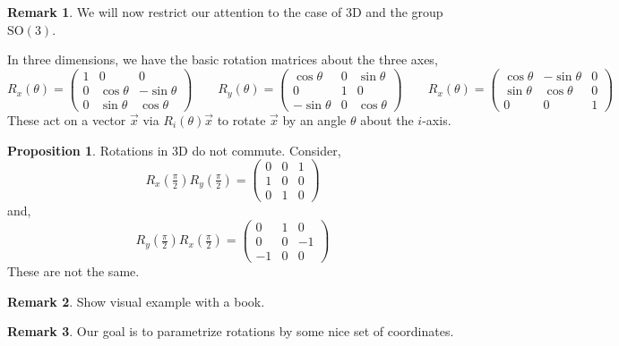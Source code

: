 \documentclass[12pt]{extarticle}
\theoremstyle{definition}
\newtheorem{proposition}[theorem]{Proposition}
\newtheorem{remark}{Remark}
\newenvironment{definition}[1][Definition:]{\begin{trivlist}
\item[\hskip \labelsep {\bfseries #1}]}{\end{trivlist}}
\newcommand{\SO}[1]{\mathrm{SO}\left(#1\right)}
\newcommand{\rd}[1]{{ \color{red} #1 }}
\begin{document}
\begin{remark}
We will now restrict our attention to the case of 3D and the group $\SO{3}$.
\end{remark}

\begin{definition}
In three dimensions, we have the basic rotation matrices about the three axes,
\[ R_x(\theta)
= 
\begin{pmatrix}
1 & 0 & 0 
\\
0 & \cos{\theta} & -\sin{\theta}
\\
0 & \sin{\theta} & \cos{\theta}
\end{pmatrix}
\quad \quad 
R_y(\theta) 
=
\begin{pmatrix}
\cos{\theta} & 0 & \sin{\theta}
\\
0 & 1 & 0
\\
-\sin{\theta} & 0 & \cos{\theta}
\end{pmatrix}
\quad \quad
R_x(\theta)
= 
\begin{pmatrix}
\cos{\theta} & - \sin{\theta} & 0 
\\
\sin{\theta} & \cos{\theta} & 0
\\
0 & 0 & 1
\end{pmatrix} \]
These act on a vector $\vec{x}$ via $R_i(\theta) \vec{x}$ to rotate $\vec{x}$ by an angle $\theta$ about the $i$-axis.
\end{definition}

\begin{proposition}
Rotations in 3D do not commute. Consider,
\[ R_x(\tfrac{\pi}{2}) R_y(\tfrac{\pi}{2}) = 
\begin{pmatrix}
0 & 0 & 1
\\
1 & 0 & 0
\\
0 & 1 & 0
\end{pmatrix} \]
and,
\[ R_y(\tfrac{\pi}{2}) R_x(\tfrac{\pi}{2}) = 
\begin{pmatrix}
0 & 1 & 0
\\
0 & 0 & -1
\\
-1 & 0 & 0
\end{pmatrix} \]
These are not the same.
\end{proposition}

\begin{remark}
\rd{Show visual example with a book.}
\end{remark}


\begin{remark}
Our goal is to parametrize rotations by some nice set of coordinates.
\end{remark}
\end{document}
